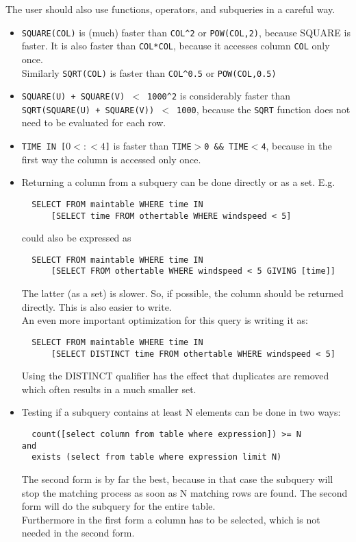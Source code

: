 The user should also use functions, operators, and subqueries in a careful way.
\begin{itemize}

\item
\texttt{SQUARE(COL)} is (much) faster than \texttt{COL}\verb+^+\texttt{2}
or \texttt{POW(COL,2)}, because SQUARE is faster.
It is also faster than \texttt{COL*COL}, because it accesses column
\texttt{COL} only once.
\\Similarly \texttt{SQRT(COL)} is faster than \texttt{COL}\verb+^+\texttt{0.5}
or \texttt{POW(COL,0.5)}

\item
\texttt{SQUARE(U) + SQUARE(V) $<$ 1000}\verb+^+\texttt{2} is considerably faster
than
\\\texttt{SQRT(SQUARE(U) + SQUARE(V)) $<$ 1000}, because the
\texttt{SQRT} function does not need to be evaluated for each row.

\item
\texttt{TIME IN [$0<:<4$]} is faster than
\texttt{TIME$>$0 \&\& TIME$<$4}, because in the first way the column is
accessed only once.

\item
Returning a column from a subquery can be done directly or as a
set. E.g.
\begin{verbatim}
  SELECT FROM maintable WHERE time IN
      [SELECT time FROM othertable WHERE windspeed < 5]
\end{verbatim}
could also be expressed as
\begin{verbatim}
  SELECT FROM maintable WHERE time IN
      [SELECT FROM othertable WHERE windspeed < 5 GIVING [time]]
\end{verbatim}
The latter (as a set) is slower. So, if possible, the column should
be returned directly. This is also easier to write.
\\An even more important optimization for this query is writing it as:
\begin{verbatim}
  SELECT FROM maintable WHERE time IN
      [SELECT DISTINCT time FROM othertable WHERE windspeed < 5]
\end{verbatim}
Using the DISTINCT qualifier has the effect that duplicates are
removed which often results in a much smaller set.

\item
Testing if a subquery contains at least N elements can be done in two
ways:
\begin{verbatim}
  count([select column from table where expression]) >= N
and
  exists (select from table where expression limit N)
\end{verbatim}
The second form is by far the best, because in that case the subquery
will stop the matching process as soon as N matching rows are found.
The second form will do the subquery for the entire table.
\\Furthermore in the first form a column has to be selected, which is
not needed in the second form.


\end{itemize}
